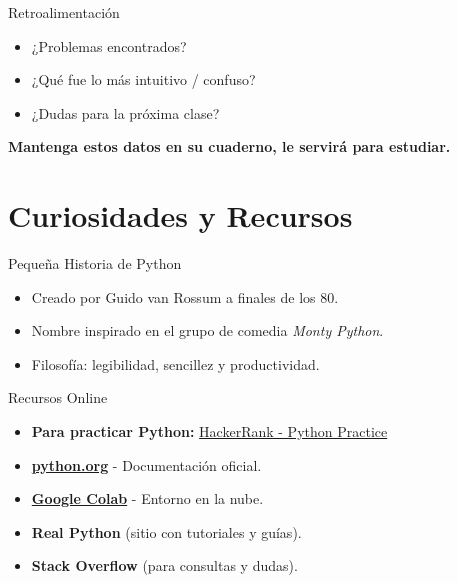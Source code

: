 \documentclass[10pt]{beamer}
\begin{document}
\begin{frame}{Retroalimentación}
  \begin{itemize}
    \item ¿Problemas encontrados?
    \item ¿Qué fue lo más intuitivo / confuso?
    \item ¿Dudas para la próxima clase?
  \end{itemize}
  \vspace{0.3cm}
  \textbf{Mantenga estos datos en su cuaderno, le servirá para estudiar.}
\end{frame}

\section{Curiosidades y Recursos}

\begin{frame}{Pequeña Historia de Python}
  \begin{itemize}
    \item Creado por Guido van Rossum a finales de los 80.
    \item Nombre inspirado en el grupo de comedia \emph{Monty Python}.
    \item Filosofía: legibilidad, sencillez y productividad.
  \end{itemize}
\end{frame}

\begin{frame}{Recursos Online}
  \begin{itemize}
    \item \textbf{Para practicar Python:} \href{https://www.hackerrank.com/domains/python?filters\%5Bdifficulty\%5D\%5B\%5D=easy}{HackerRank - Python Practice}
    \item \href{https://www.python.org}{\textbf{python.org}} - Documentación oficial.
    \item \href{https://colab.research.google.com}{\textbf{Google Colab}} - Entorno en la nube.
    \item \textbf{Real Python} (sitio con tutoriales y guías).
    \item \textbf{Stack Overflow} (para consultas y dudas).
  \end{itemize}
\end{frame}
\end{document}
